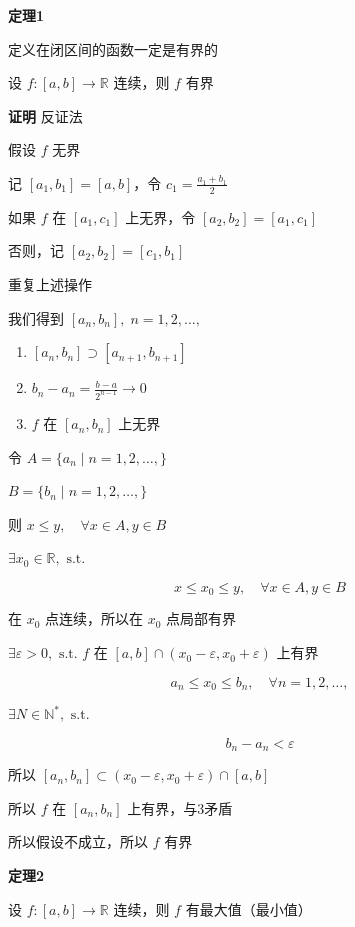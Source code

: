 \textbf{定理1}

定义在闭区间的函数一定是有界的

设 \(f:[a,b]\to \mathbb{R}\) 连续，则 \(f\) 有界

\textbf{证明} 反证法

假设 \(f\) 无界

记 \([a_{1},b_{1}]=[a,b]\)，令 \(c_{1}=\frac{a_{1}+b_{1}}{2}\)

如果 \(f\) 在 \([a_{1},c_{1}]\) 上无界，令
\([a_{2},b_{2}]=[a_{1},c_{1}]\)

否则，记 \([a_{2},b_{2}]=[c_{1},b_{1}]\)

重复上述操作

我们得到 \([a_{n},b_{n}],  \; n=1,2,\dots,\)

\begin{enumerate}
\def\labelenumi{\arabic{enumi}.}
\tightlist
\item
  \([a_{n},b_{n}]\supset [a_{n+1},b_{n+1}]\)
\item
  \(b_{n}-a_{n}=\frac{b-a}{2^{n-1}}\to 0\)
\item
  \(f\) 在 \([a_{n},b_{n}]\) 上无界
\end{enumerate}

令 \(A=\{ a_{n} \mid n=1,2,\dots, \}\)

\(B=\{ b_{n} \mid n=1,2,\dots, \}\)

则 \(x\leq y,\quad \forall x \in A, y \in B\)

\(\exists x_{0}\in \mathbb{R},\text{ s.t.}\)

\[
x\leq x_{0}\leq y, \quad \forall x \in A, y \in B
\]

在 \(x_{0}\) 点连续，所以在 \(x_{0}\) 点局部有界

\(\exists \varepsilon>0,\text{ s.t. } f\) 在
\([a, b]\cap(x_{0}-\varepsilon,x_{0}+\varepsilon)\) 上有界

\[
a_{n}\leq x_{0}\leq b_{n}, \quad \forall n=1,2,\dots,
\]

\(\exists N \in \mathbb{N}^{*},\text{ s.t.}\)

\[
b_{n}-a_{n}<\varepsilon
\]

所以
\([a_{n},b_{n}]\subset(x_{0}-\varepsilon,x_{0}+\varepsilon) \cap [a,b]\)

所以 \(f\) 在 \([a_{n},b_{n}]\) 上有界，与3矛盾

所以假设不成立，所以 \(f\) 有界

\textbf{定理2}

设 \(f:[a,b]\to \mathbb{R}\) 连续，则 \(f\) 有最大值（最小值）

